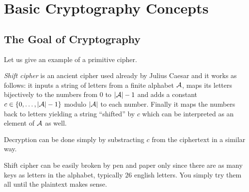 \section{Basic Cryptography Concepts}
\label{sec:cryptobasics}

\subsection{The Goal of Cryptography}





Let us give an example of a primitive cipher.

\begin{example}
\label{ex:shift}
	{\em Shift cipher} is an ancient cipher used already by Julius Caesar and it works as follows: it inputs a string of letters from a finite alphabet $\cal A$, maps its letters bijectively to the numbers from $0$ to $|{\cal A}|-1$ and adds a constant $c\in\{0 , \ldots , |{\cal A}|-1\}$ modulo $|\cal A|$ to each number. Finally it maps the numbers back to letters yielding a string ``shifted'' by $c$ which can be interpreted as an element of $\cal A$ as well.
	
	Decryption can be done simply by substracting $c$ from the ciphertext in a similar way.
\end{example}

Shift cipher can be easily broken by pen and paper only since there are as many keys as letters in the alphabet, typically $26$ english letters. You simply try them all until the plaintext makes sense.

